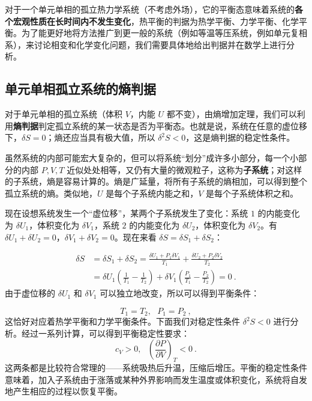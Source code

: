 
对于一个单元单相的孤立热力学系统（不考虑外场），它的平衡态意味着系统的\textbf{各个宏观性质在长时间内不发生变化}，热平衡的判据为热学平衡、力学平衡、化学平衡。为了能更好地将方法推广到更一般的系统（例如等温等压系统，例如单元复相系），来讨论相变和化学变化问题，我们需要具体地给出判据并在数学上进行分析。

\subsection{单元单相孤立系统的熵判据}

对于单元单相的孤立系统（体积 $V$，内能 $U$ 都不变），由熵增加定理，我们可以利用\textbf{熵判据}判定孤立系统的某一状态是否为平衡态。也就是说，系统在任意的虚位移下，$\delta S=0$；熵还应当具有极大值，所以 $\delta^2S<0$，这是熵判据的稳定性条件。

虽然系统的内部可能宏大复杂的，但可以将系统“划分”成许多小部分，每一个小部分的内部 $P,V,T$ 近似处处相等，又仍有大量的微观粒子，这称为\textbf{子系统}；对这样的子系统，熵是容易计算的。熵是广延量，将所有子系统的熵相加，可以得到整个孤立系统的熵。类似地，$U$ 是每个子系统内能之和，$V$ 是每个子系统体积之和。

现在设想系统发生一个“虚位移”，某两个子系统发生了变化：系统 $1$ 的内能变化为 $\delta U_1$，体积变化为 $\delta V_1$，系统 $2$ 的内能变化为 $\delta U_2$，体积变化为 $\delta V_2$。有 $\delta U_1+\delta U_2=0$，$\delta V_1+\delta V_2=0$。现在来看 $\delta S=\delta S_1+\delta S_2$：

\begin{align}
\delta S&=\delta S_1+\delta S_2=\frac{\delta U_1+P_1\delta V_1}{T_1}+\frac{\delta U_2+P_2\delta V_2}{T_2}
\\
&=\delta U_1\left(\frac{1}{T_1}-\frac{1}{T_2}\right)
+\delta V_1\left(\frac{P_1}{T_1}-\frac{P_2}{T_2}\right)=0~.
\end{align}
由于虚位移的 $\delta U_1$ 和 $\delta V_1$ 可以独立地改变，所以可以得到平衡条件：

\begin{equation}
T_1=T_2,\ \ \ P_1=P_2~,
\end{equation}
这恰好对应着热学平衡和力学平衡条件。下面我们对稳定性条件 $\delta^2 S<0$ 进行分析。经过一系列计算，可以得到平衡稳定性要求：
\begin{equation}
c_V>0,\ \ \ \left(\frac{\partial P}{\partial V}\right)_T<0~.
\end{equation}
这两条都是比较符合常理的——系统吸热后升温，压缩后增压。平衡的稳定性条件意味着，加入子系统由于涨落或某种外界影响而发生温度或体积变化，系统将自发地产生相应的过程以恢复平衡。

